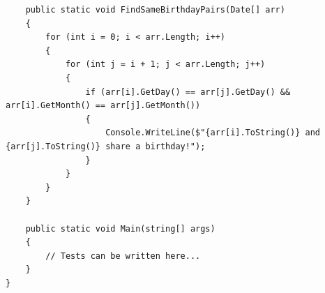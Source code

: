 \documentclass[14pt]{extarticle}
\begin{document}
{\begin{boxSolution}
\begin{english}
\begin{verbatim}
    public static void FindSameBirthdayPairs(Date[] arr)
    {
        for (int i = 0; i < arr.Length; i++)
        {
            for (int j = i + 1; j < arr.Length; j++)
            {
                if (arr[i].GetDay() == arr[j].GetDay() && arr[i].GetMonth() == arr[j].GetMonth())
                {
                    Console.WriteLine($"{arr[i].ToString()} and {arr[j].ToString()} share a birthday!");
                }
            }
        }
    }

    public static void Main(string[] args)
    {
        // Tests can be written here...
    }
}
\end{verbatim}
\end{english}
\end{boxSolution}
}
\fi
\end{document}
